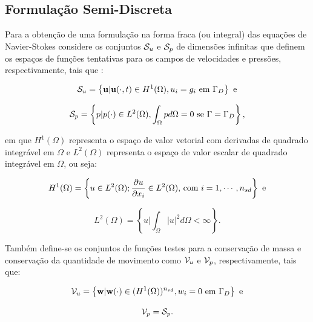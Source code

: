 \documentclass[_ArquivoPrincipal.tex]{subfiles}
\begin{document}
\subsection{Formulação Semi-Discreta} \label{FSD}

Para a obtenção de uma formulação na forma fraca (ou integral) das equações de Navier-Stokes considere os conjuntos $\mathcal{S}_u$ e $\mathcal{S}_p$ de dimensões infinitas que definem os espaços de funções tentativas para os campos de velocidades e pressões, respectivamente, tais que \cite{bazilevs2013computational,fernandes2020tecnica}:

\begin{equation}
    \mathcal{S}_u=\left\{\mathbf{u}|\mathbf{u}(\cdot,t)\in H^1(\Omega),u_i=g_i\text{ em }\Gamma_D\right\}\text{ e}
\end{equation}

\begin{equation}
    \mathcal{S}_p=\left\{p|p(\cdot)\in L^2(\Omega),\int_\Omega{pd\Omega}=0\text{ se }\Gamma=\Gamma_D\right\}\text{,}
\end{equation}

\noindent em que $H^1(\Omega)$ representa o espaço de valor vetorial com derivadas de quadrado integrável em $\Omega$ e $L^2(\Omega)$ representa o espaço de valor escalar de quadrado integrável em $\Omega$, ou seja:

\begin{equation}
    H^1(\Omega)=\left\{u\in L^2(\Omega);\frac{\partial{u}}{\partial{x_i}}\in L^2(\Omega)\text{, com }i=1,\cdots,n_{sd}\right\}\text{ e}
\end{equation}

\begin{equation}
    L^2(\Omega)=\left\{u|\int_\Omega{|u|^2d\Omega}<\infty\right\}\text{.}
\end{equation}

Também define-se os conjuntos de funções testes para a conservação de massa e conservação da quantidade de movimento como $\mathcal{V}_u$ e $\mathcal{V}_p$, respectivamente, tais que:

\begin{equation}
    \mathcal{V}_u=\left\{\mathbf{w}|\mathbf{w}(\cdot)\in(H^1(\Omega))^{n_{sd}},w_i=0\text{ em }\Gamma_D\right\}\text{ e}
\end{equation}

\begin{equation}
    \mathcal{V}_p=\mathcal{S}_p\text{.}
\end{equation}
\end{document}
